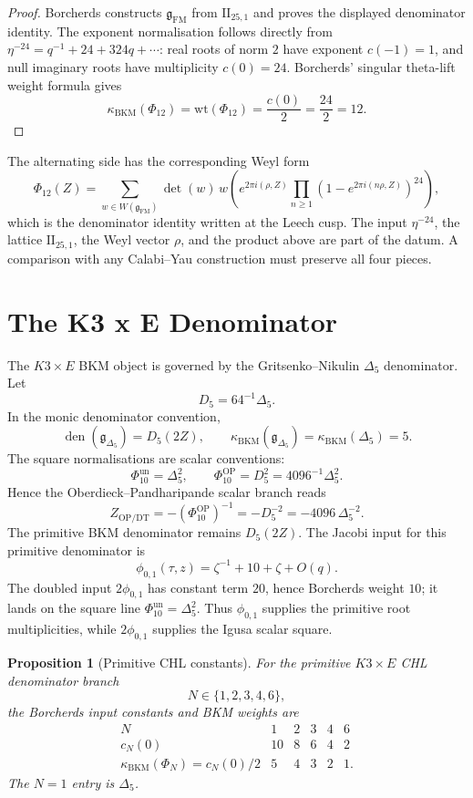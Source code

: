 \documentclass[11pt]{amsart}
\newtheorem{proposition}[theorem]{Proposition}
\theoremstyle{definition}
\theoremstyle{remark}
\providecommand{\IIlor}{\mathrm{II}_{25,1}}
\providecommand{\PhiFM}{\Phi_{12}}
\providecommand{\gFM}{\mathfrak{g}_{\mathrm{FM}}}
\providecommand{\gDelta}{\mathfrak{g}_{\Delta_5}}
\providecommand{\kBKM}{\kappa_{\mathrm{BKM}}}
\providecommand{\wt}{\mathrm{wt}}
\begin{document}
\begin{proof}
Borcherds constructs \(\gFM\) from \(\IIlor\) and proves the displayed
denominator identity. The exponent normalisation follows directly from
\(\eta^{-24}=q^{-1}+24+324q+\cdots\): real roots of norm \(2\) have
exponent \(c(-1)=1\), and null imaginary roots have multiplicity
\(c(0)=24\). Borcherds' singular theta-lift weight formula gives
\[
 \kBKM(\PhiFM)
 =
 \wt(\PhiFM)
 =
 \frac{c(0)}{2}
 =
 \frac{24}{2}
 =
 12 .
\]
\end{proof}

The alternating side has the corresponding Weyl form
\[
 \PhiFM(Z)
 =
 \sum_{w\in W(\gFM)}
 \det(w)\,
 w\!\left(
   e^{2\pi i(\rho,Z)}
   \prod_{n\geq1}
   \left(1-e^{2\pi i(n\rho,Z)}\right)^{24}
 \right),
\]
which is the denominator identity written at the Leech cusp. The input
\(\eta^{-24}\), the lattice \(\IIlor\), the Weyl vector \(\rho\), and the
product above are part of the datum. A comparison with any Calabi--Yau
construction must preserve all four pieces.

\section{The K3 x E Denominator}

The \(K3\times E\) BKM object is governed by the Gritsenko--Nikulin
\(\Delta_5\) denominator. Let
\[
 D_5=64^{-1}\Delta_5 .
\]
In the monic denominator convention,
\[
 \operatorname{den}(\gDelta)=D_5(2Z),\qquad
 \kBKM(\gDelta)=\kBKM(\Delta_5)=5 .
\]
The square normalisations are scalar conventions:
\[
 \Phi_{10}^{\mathrm{un}}=\Delta_5^2,\qquad
 \Phi_{10}^{\mathrm{OP}}=D_5^2=4096^{-1}\Delta_5^2 .
\]
Hence the Oberdieck--Pandharipande scalar branch reads
\[
 Z_{\mathrm{OP/DT}}=-(\Phi_{10}^{\mathrm{OP}})^{-1}
 =
 -D_5^{-2}
 =
 -4096\,\Delta_5^{-2}.
\]
The primitive BKM denominator remains \(D_5(2Z)\).
The Jacobi input for this primitive denominator is
\[
 \phi_{0,1}(\tau,z)=\zeta^{-1}+10+\zeta+O(q).
\]
The doubled input \(2\phi_{0,1}\) has constant term \(20\), hence
Borcherds weight \(10\); it lands on the square line
\(\Phi_{10}^{\mathrm{un}}=\Delta_5^2\). Thus
\(\phi_{0,1}\) supplies the primitive root multiplicities, while
\(2\phi_{0,1}\) supplies the Igusa scalar square.

\begin{proposition}[Primitive CHL constants]
\label{prop:primitive-chl-constants}
For the primitive \(K3\times E\) CHL denominator branch
\[
 N\in\{1,2,3,4,6\},
\]
the Borcherds input constants and BKM weights are
\[
\begin{array}{c|ccccc}
N & 1 & 2 & 3 & 4 & 6\\
\hline
c_N(0) & 10 & 8 & 6 & 4 & 2\\
\kBKM(\Phi_N)=c_N(0)/2 & 5 & 4 & 3 & 2 & 1 .
\end{array}
\]
The \(N=1\) entry is \(\Delta_5\).
\end{proposition}
\end{document}
